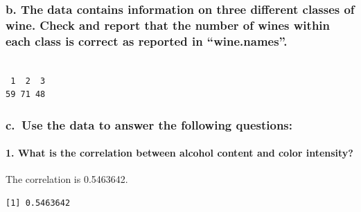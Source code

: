 \documentclass[
  letterpaper,
  DIV=11,
  numbers=noendperiod]{scrartcl}
\let\oldparagraph\paragraph
\renewcommand{\paragraph}[1]{\oldparagraph{#1}\mbox{}}
\newenvironment{Shaded}{\begin{snugshade}}{\end{snugshade}}
\newcommand{\CommentTok}[1]{\textcolor[rgb]{0.37,0.37,0.37}{#1}}
\newcommand{\FunctionTok}[1]{\textcolor[rgb]{0.28,0.35,0.67}{#1}}
\newcommand{\NormalTok}[1]{\textcolor[rgb]{0.00,0.23,0.31}{#1}}
\newcommand{\SpecialCharTok}[1]{\textcolor[rgb]{0.37,0.37,0.37}{#1}}
\begin{document}
\subsubsection{b. The data contains information on three different
classes of wine. Check and report that the number of wines within each
class is correct as reported in
``wine.names''.}\label{b.-the-data-contains-information-on-three-different-classes-of-wine.-check-and-report-that-the-number-of-wines-within-each-class-is-correct-as-reported-in-wine.names.}

\begin{Shaded}
\end{Shaded}

\begin{verbatim}

 1  2  3 
59 71 48 
\end{verbatim}

\subsubsection{c.~Use the data to answer the following
questions:}\label{c.-use-the-data-to-answer-the-following-questions}

\paragraph{1. What is the correlation between alcohol content and color
intensity?}\label{what-is-the-correlation-between-alcohol-content-and-color-intensity}

The correlation is 0.5463642.

\begin{Shaded}
\end{Shaded}

\begin{verbatim}
[1] 0.5463642
\end{verbatim}
\end{document}
